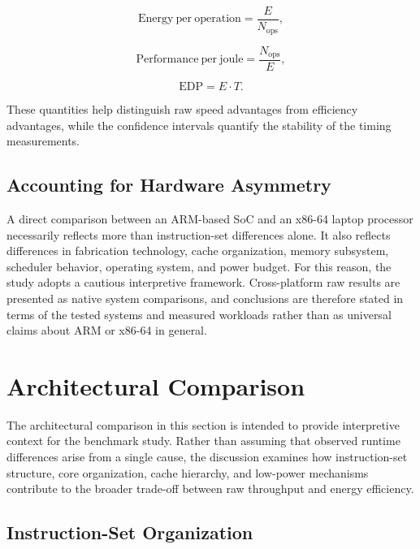 \documentclass{tcsa}
\begin{document}
\begin{equation}
\mathrm{Energy\ per\ operation} = \frac{E}{N_{\mathrm{ops}}},
\end{equation}

\begin{equation}
\mathrm{Performance\ per\ joule} = \frac{N_{\mathrm{ops}}}{E},
\end{equation}

\begin{equation}
\mathrm{EDP} = E \cdot T.
\end{equation}

These quantities help distinguish raw speed advantages from efficiency
advantages, while the confidence intervals quantify the stability of the timing
measurements.

\subsection{Accounting for Hardware Asymmetry}

A direct comparison between an ARM-based SoC and an x86-64 laptop processor 
necessarily reflects more than instruction-set differences alone. It also reflects 
differences in fabrication technology, cache organization, memory subsystem, 
scheduler behavior, operating system, and power budget. For this reason, the study 
adopts a cautious interpretive framework. Cross-platform raw results are presented 
as native system comparisons, and conclusions are therefore stated in terms of the 
tested systems and measured workloads rather than as universal claims about ARM or 
x86-64 in general.

\section{Architectural Comparison}

The architectural comparison in this section is intended to provide interpretive 
context for the benchmark study. Rather than assuming that observed runtime 
differences arise from a single cause, the discussion examines how instruction-set 
structure, core organization, cache hierarchy, and low-power mechanisms contribute 
to the broader trade-off between raw throughput and energy efficiency.

\subsection{Instruction-Set Organization}
\end{document}
